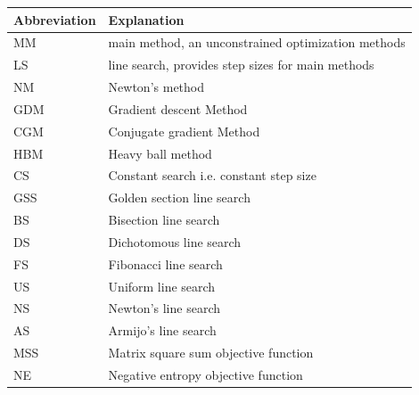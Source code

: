 \documentclass[english, 12pt, a4paper, sci, utf8, a-1b, online, table]{aaltothesis}
\begin{document}
\begin{table}[H]
  \label{tab:abbreviations}
  \centering
  \begin{tabular}{|l|l|}
  \hline
  \rowcolor{gray!25}
  \textbf{Abbreviation} & \textbf{Explanation} \\
  \hline
  MM                    & main method, an unconstrained optimization methods                              \\
  LS                    & line search, provides step sizes for main methods                               \\
  NM                    & Newton's method                                                                 \\
  GDM                   & Gradient descent Method                                                         \\
  CGM                   & Conjugate gradient Method                                                       \\
  HBM                   & Heavy ball method                                                               \\
  CS                    & Constant search i.e. constant step size                                         \\
  GSS                   & Golden section line search                                                      \\
  BS                    & Bisection line search                                                           \\
  DS                    & Dichotomous line search                                                         \\
  FS                    & Fibonacci line search                                                           \\
  US                    & Uniform line search                                                             \\
  NS                    & Newton's line search                                                            \\
  AS                    & Armijo's line search                                                            \\
  MSS                   & Matrix square sum objective function                                            \\
  NE                    & Negative entropy objective function                                             \\
  \hline
  \end{tabular}
\end{table}
\end{document}

